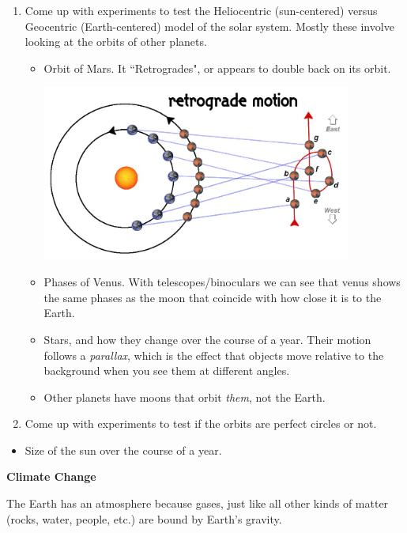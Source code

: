 \documentclass[12pt]{article}
\begin{document}
\begin{enumerate}
\begin{itemize}
	\end{itemize}
\item Come up with experiments to test the Heliocentric (sun-centered) versus Geocentric (Earth-centered) model of the solar system. Mostly these involve looking at the orbits of other planets.
	\begin{itemize}
	\item Orbit of Mars. It ``Retrogrades", or appears to double back on its orbit.
	
	\includegraphics[width=4in]{../images/retrograde-motion.jpg}
	
	\item Phases of Venus. With telescopes/binoculars we can see that venus shows the same phases as the moon that coincide with how close it is to the Earth.
	
	\item Stars, and how they change over the course of a year. Their motion follows a \textit{parallax}, which is the effect that objects move relative to the background when you see them at different angles.
	
	\item Other planets have moons that orbit \textit{them}, not the Earth.
	\end{itemize}
	
\item Come up with experiments to test if the orbits are perfect circles or not.
\end{enumerate}
	\begin{itemize}
		\item Size of the sun over the course of a year.
	\end{itemize}

\begin{center}\textbf{\Large Climate Change}\end{center}

The Earth has an atmosphere because gases, just like all other kinds of matter (rocks, water, people, etc.) are bound by Earth's gravity.
\end{document}
